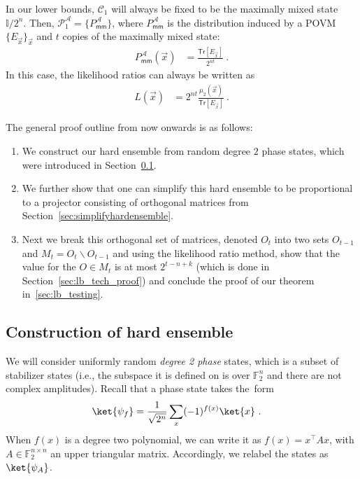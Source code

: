 \documentclass[11pt]{article}
\newcommand{\id}{\ensuremath{\mathbb{I}}}
\newcommand{\Tr}{\mathsf{Tr}}
\newcommand{\F}{\mathbb{F}}
\begin{document}
In our lower bounds, $\mathcal{C}_1$ will always be fixed to be the maximally mixed state $\id/{2^n}$. Then, $\mathcal{P}_1^{\mathcal{A}} = \{P_{\textsf{mm}}^{\mathcal{A}}\}$, where $P_{\textsf{mm}}^{\mathcal{A}}$ is the distribution induced by a POVM $\{E_{\vec{x}}\}_{\vec{x}}$ and $t$ copies of the maximally mixed state:
\begin{align}
    P_{\textsf{mm}}^{\mathcal{A}}(\vec{x}) & = \frac{\Tr[E_{\vec{x}}]}{2^{nt}}\ .
\end{align}
In this case, the likelihood ratios can always be written as 
\begin{align}
    L(\vec{x}) & = 2^{nt}\frac{\mu_2(\vec{x})}{\Tr[E_{\vec{x}}]}\ .
\end{align}
{The general proof outline from now onwards is as follows:
\begin{enumerate}
    \item We construct our hard ensemble from random degree $2$ phase states, which were introduced in Section~\ref{sec:hardensemble}.
    \item We further show that one can simplify this hard ensemble to be proportional to a projector consisting of orthogonal matrices from Section~\ref{sec:simplifyhardensemble}.
    \item Next we break this orthogonal set of matrices, denoted $O_t$ into two sets $O_{t-1}$ and $M_t=O_t\backslash O_{t-1}$ and using the likelihood ratio method, show that the value for the $O\in M_t$ is at most $2^{t-n+k}$ (which is done in Section~\ref{sec:lb_tech_proof}) and conclude the proof of our theorem in~\ref{sec:lb_testing}.
\end{enumerate}}

\subsection{Construction of hard ensemble}
\label{sec:hardensemble}
 We will consider uniformly random \emph{degree 2 phase} states, which is a subset of stabilizer states (i.e., the subspace it is defined on is over $\F_2^n$ and there are not complex amplitudes). Recall that a phase state takes the~form
\begin{align}
    \ket{\psi_f}& = \frac{1}{\sqrt{2^{n}}}\sum_x (-1)^{f(x)}\ket{x}\ .
\end{align}
When $f(x)$ is a degree two polynomial, we can write it as $f(x) = x^\top A x$, with $A\in \F_2^{n \times n}$ an upper triangular matrix. Accordingly, we relabel the states as $\ket{\psi_A}$.
\end{document}

